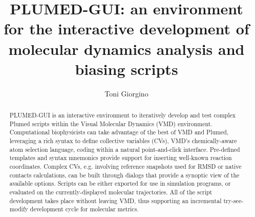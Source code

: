 \documentclass[preprint,12pt]{elsarticle}
\newcommand{\mytitle}{PLUMED-GUI: an environment for the interactive development 
  of molecular dynamics analysis and biasing scripts}
\begin{document}
\begin{frontmatter}


\title{\mytitle}
\author{Toni Giorgino}
\address{Institute of Biomedical Engineering (ISIB),\\ 
National Research Council of Italy (CNR),\\
Padua, Italy}




\begin{abstract}
  PLUMED-GUI is an interactive environment to iteratively develop and
  test complex Plumed scripts within the Visual Molecular Dynamics
  (VMD) environment. Computational biophysicists can take advantage of
  the best of VMD and Plumed, leveraging a rich syntax to define
  collective variables (CVs), VMD's chemically-aware atom selection
  language, coding within a natural point-and-click interface.
  Pre-defined templates and syntax mnemonics provide support for
  inserting well-known reaction coordinates. Complex CVs,
  e.g. involving reference snapshots used for RMSD or native contacts
  calculations, can be built through dialogs that provide a synoptic
  view of the available options.  Scripts can be either exported for
  use in simulation programs, or evaluated on the currently-displayed
  molecular trajectories. All of the script development takes place
  without leaving VMD, thus supporting an incremental try-see-modify
  development cycle for molecular metrics.
\end{abstract}


\end{frontmatter}
\end{document}
